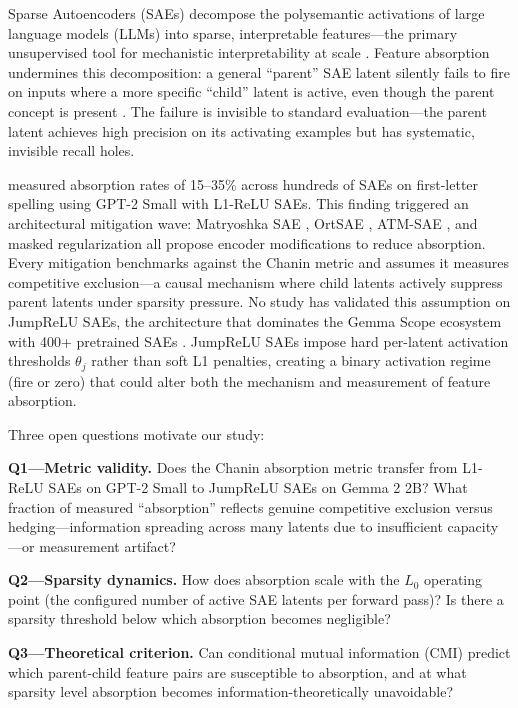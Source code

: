 \documentclass{article}
\begin{document}
Sparse Autoencoders (SAEs) decompose the polysemantic activations of large language models (LLMs) into sparse, interpretable features---the primary unsupervised tool for mechanistic interpretability at scale \citep{cunningham2023sparse, bricken2023monosemanticity, templeton2024scaling}. Feature absorption undermines this decomposition: a general ``parent'' SAE latent silently fails to fire on inputs where a more specific ``child'' latent is active, even though the parent concept is present \citep{chanin2024absorption}. The failure is invisible to standard evaluation---the parent latent achieves high precision on its activating examples but has systematic, invisible recall holes.

\citet{chanin2024absorption} measured absorption rates of 15--35\% across hundreds of SAEs on first-letter spelling using GPT-2 Small with L1-ReLU SAEs. This finding triggered an architectural mitigation wave: Matryoshka SAE \citep{bussmann2025matryoshka}, OrtSAE \citep{korznikov2025ortsae}, ATM-SAE \citep{li2025atm}, and masked regularization \citep{narayanaswamy2026masked} all propose encoder modifications to reduce absorption. Every mitigation benchmarks against the Chanin metric and assumes it measures competitive exclusion---a causal mechanism where child latents actively suppress parent latents under sparsity pressure. No study has validated this assumption on JumpReLU SAEs, the architecture that dominates the Gemma Scope ecosystem with 400+ pretrained SAEs \citep{lieberum2024gemmascope}. JumpReLU SAEs impose hard per-latent activation thresholds $\theta_j$ rather than soft L1 penalties, creating a binary activation regime (fire or zero) that could alter both the mechanism and measurement of feature absorption.

Three open questions motivate our study:

\textbf{Q1---Metric validity.} Does the Chanin absorption metric transfer from L1-ReLU SAEs on GPT-2 Small to JumpReLU SAEs on Gemma 2 2B? What fraction of measured ``absorption'' reflects genuine competitive exclusion versus hedging---information spreading across many latents due to insufficient capacity \citep{chanin2025hedging}---or measurement artifact?

\textbf{Q2---Sparsity dynamics.} How does absorption scale with the $L_0$ operating point (the configured number of active SAE latents per forward pass)? Is there a sparsity threshold below which absorption becomes negligible?

\textbf{Q3---Theoretical criterion.} Can conditional mutual information (CMI) predict which parent-child feature pairs are susceptible to absorption, and at what sparsity level absorption becomes information-theoretically unavoidable?
\end{document}
